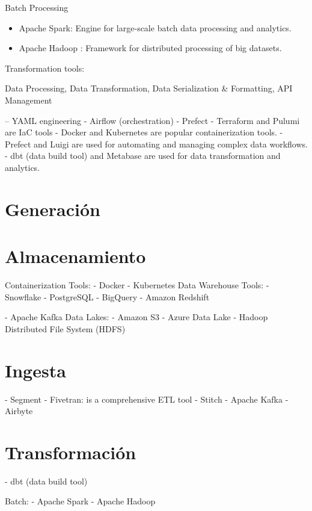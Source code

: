 \documentclass[12pt]{book}
\begin{document}
Batch Processing
\begin{itemize}
    \item Apache Spark: Engine for large-scale batch data processing and analytics.
    \item Apache Hadoop : Framework for distributed processing of big datasets.
\end{itemize}

Transformation tools:


Data Processing, Data Transformation, Data Serialization & Formatting, API Management

--  YAML engineering 
- Airflow (orchestration)
- Prefect
- Terraform and Pulumi are IaC tools
- Docker and Kubernetes are popular containerization tools.
- Prefect and Luigi are used for automating and managing complex data workflows.
- dbt (data build tool) and Metabase are used for data transformation and analytics.

\section{Generación}
\section{Almacenamiento}
Containerization Tools:
- Docker
- Kubernetes
Data Warehouse Tools:
- Snowflake
- PostgreSQL
- BigQuery
- Amazon Redshift

- Apache Kafka
Data Lakes:
- Amazon S3
- Azure Data Lake
- Hadoop Distributed File System (HDFS)

\section{Ingesta}
- Segment
- Fivetran: is a comprehensive ETL tool
- Stitch
- Apache Kafka
- Airbyte 
\section{Transformación}

- dbt (data build tool)

Batch:
- Apache Spark
- Apache Hadoop
\end{document}
